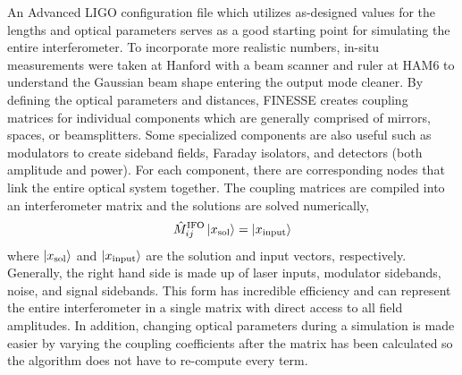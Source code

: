 	An Advanced LIGO configuration file \cite{FinesseH1} which utilizes as-designed values for the lengths and optical parameters serves as a good starting point for simulating the entire interferometer.  To incorporate more realistic numbers, in-situ measurements were taken at Hanford with a beam scanner and ruler at HAM6 to understand the Gaussian beam shape entering the output mode cleaner. By defining the optical parameters and distances, FINESSE creates coupling matrices for individual components which are generally comprised of mirrors, spaces, or beamsplitters.  Some specialized components are also useful such as modulators to create sideband fields, Faraday isolators, and detectors (both amplitude and power).  For each component, there are corresponding nodes that link the entire optical system together.  The coupling matrices are compiled into an interferometer matrix and the solutions are solved numerically,
	\begin{equation}
	\hat{M}_{ij}^{\text{IFO}} \ket{x_{\text{sol}}} = \ket{x_{\text{input}}}
	\end{equation}
	where $\ket{x_{\text{sol}}}$ and $\ket{x_{\text{input}}}$ are the solution and input vectors, respectively. Generally, the right hand side is made up of laser inputs, modulator sidebands, noise, and signal sidebands. This form has incredible efficiency and can represent the entire interferometer in a single matrix with direct access to all field amplitudes.  In addition, changing optical parameters during a simulation is made easier by varying the coupling coefficients after the matrix has been calculated so the algorithm does not have to re-compute every term.
